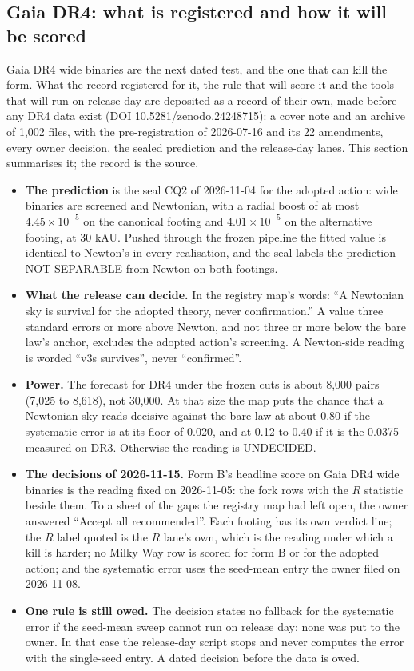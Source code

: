 \documentclass[10pt]{article}
\begin{document}
\subsection{Gaia DR4: what is registered and how it will be scored}
Gaia DR4 wide binaries are the next dated test, and the one that can kill the form. What the record registered for it, the rule that will score it and the tools that will run on release day are deposited as a record of their own, made before any DR4 data exist (DOI 10.5281/zenodo.24248715): a cover note and an archive of 1,002 files, with the pre-registration of 2026-07-16 and its 22 amendments, every owner decision, the sealed prediction and the release-day lanes. This section summarises it; the record is the source.
\begin{itemize}
\item \textbf{The prediction} is the seal CQ2 of 2026-11-04 for the adopted action: wide binaries are screened and Newtonian, with a radial boost of at most $4.45\times10^{-5}$ on the canonical footing and $4.01\times10^{-5}$ on the alternative footing, at 30 kAU. Pushed through the frozen pipeline the fitted value is identical to Newton's in every realisation, and the seal labels the prediction NOT SEPARABLE from Newton on both footings.
\item \textbf{What the release can decide.} In the registry map's words: ``A Newtonian sky is survival for the adopted theory, never confirmation.'' A value three standard errors or more above Newton, and not three or more below the bare law's anchor, excludes the adopted action's screening. A Newton-side reading is worded ``v3s survives'', never ``confirmed''.
\item \textbf{Power.} The forecast for DR4 under the frozen cuts is about 8,000 pairs (7,025 to 8,618), not 30,000. At that size the map puts the chance that a Newtonian sky reads decisive against the bare law at about 0.80 if the systematic error is at its floor of 0.020, and at 0.12 to 0.40 if it is the 0.0375 measured on DR3. Otherwise the reading is UNDECIDED.
\item \textbf{The decisions of 2026-11-15.} Form B's headline score on Gaia DR4 wide binaries is the reading fixed on 2026-11-05: the fork rows with the $R$ statistic beside them. To a sheet of the gaps the registry map had left open, the owner answered ``Accept all recommended''. Each footing has its own verdict line; the $R$ label quoted is the $R$ lane's own, which is the reading under which a kill is harder; no Milky Way row is scored for form B or for the adopted action; and the systematic error uses the seed-mean entry the owner filed on 2026-11-08.
\item \textbf{One rule is still owed.} The decision states no fallback for the systematic error if the seed-mean sweep cannot run on release day: none was put to the owner. In that case the release-day script stops and never computes the error with the single-seed entry. A dated decision before the data is owed.
\end{itemize}
\end{document}
